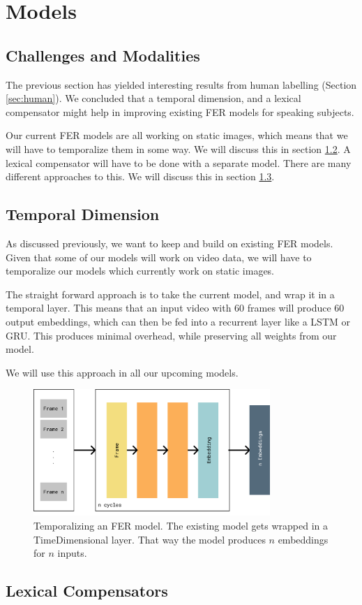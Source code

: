 \section{Models}
\label{sec:models}

\subsection{Challenges and Modalities}
The previous section has yielded interesting results from human labelling (Section \ref{sec:human}). We concluded that a temporal dimension, and a lexical compensator might help in improving existing FER models for speaking subjects. 

Our current FER models are all working on static images, which means that we will have to temporalize them in some way. We will discuss this in section \ref{sub:temp}. A lexical compensator will have to be done with a separate model. There are many different approaches to this. We will discuss this in section \ref{sub:lex}.


\subsection{Temporal Dimension}
\label{sub:temp}
As discussed previously, we want to keep and build on existing FER models. Given that some of our models will work on video data, we will have to temporalize our models which currently work on static images.

The straight forward approach is to take the current model, and wrap it in a temporal layer. This means that an input video with 60 frames will produce 60 output embeddings, which can then be fed into a recurrent layer like a LSTM or GRU. This produces minimal overhead, while preserving all weights from our model.

We will use this approach in all our upcoming models.

\begin{figure}
    \centering
    \includegraphics[width=0.8\textwidth]{res/temporalization.pdf}
    \caption{Temporalizing an FER model. The existing model gets wrapped in a TimeDimensional layer. That way the model produces $n$ embeddings for $n$ inputs.}
    \label{fig:temporalization}
\end{figure}

\subsection{Lexical Compensators}
\label{sub:lex}